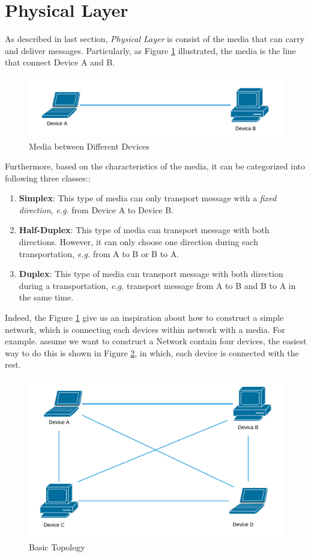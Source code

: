 \documentclass[10pt,a4paper]{article}
\begin{document}
\section{Physical Layer}
As described in last section, \textit{Physical Layer} is consist of the media that can carry and deliver messages. Particularly, as Figure \ref{physical_layer} illustrated, the media is the line that connect Device A and B. 
\begin{figure}[ht]
	\center
	\includegraphics[scale=0.85]{Physical}
	\caption{Media between Different Devices}
	\label{physical_layer}
\end{figure}
Furthermore, based on the characteristics of the media, it can be categorized into following three classes::
\begin{enumerate}
	\item \textbf{Simplex}: This type of media can only transport message with a \textit{fixed direction}, \textsl{e.g.} from Device A to Device B.
	\item \textbf{Half-Duplex}: This type of media can transport message with both directions. However, it can only choose one direction during each transportation, \textsl{e.g.} from A to B or B to A.
	\item \textbf{Duplex}: This type of media can transport message with both direction during a transportation, \textsl{e.g.} transport message from A to B and B to A in the same time.
\end{enumerate}
Indeed, the Figure \ref{physical_layer} give us an inspiration about how to construct a simple network, which is connecting each devices within network with a media. For example. assume we want to construct a Network contain four devices, the easiest way to do this is shown in Figure \ref{topology_basic}, in which, each device is connected with the rest.
\begin{figure}[H]
	\center
	\includegraphics[scale=0.5]{Topology}
	\caption{Basic Topology}
	\label{topology_basic}
\end{figure}
\end{document}
